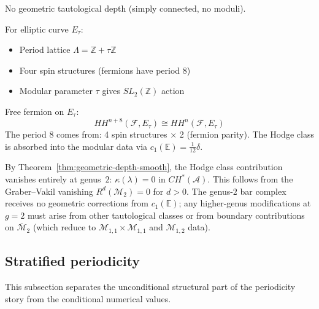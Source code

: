 \begin{example}
No geometric tautological depth (simply connected, no moduli).
\end{example}

\begin{example}
For elliptic curve $E_{\tau}$:
\begin{itemize}
\item Period lattice $\Lambda = \mathbb{Z} + \tau\mathbb{Z}$
\item Four spin structures (fermions have period 8)
\item Modular parameter $\tau$ gives $SL_2(\mathbb{Z})$ action
\end{itemize}

Free fermion on $E_{\tau}$:
\[
HH^{n+8}(\mathcal{F}, E_{\tau}) \cong HH^n(\mathcal{F}, E_{\tau})
\]
The period 8 comes from: 4 spin structures $\times$ 2 (fermion parity).
The Hodge class is absorbed into the modular data via
$c_1(\mathbb{E}) = \frac{1}{12}\delta$.
\end{example}

\begin{example}
\label{ex:genus2-hodge-vanishing}
By Theorem~\ref{thm:geometric-depth-smooth}, the Hodge class
contribution vanishes entirely at genus~$2$:
$\kappa(\lambda) = 0$ in $CH^*(\mathcal{A})$.  This follows from
the Graber--Vakil vanishing $R^d(\mathcal{M}_2) = 0$ for $d > 0$.
The genus-$2$ bar complex receives no geometric corrections from
$c_1(\mathbb{E})$; any higher-genus modifications at $g = 2$ must
arise from other tautological classes or from boundary
contributions on $\overline{\mathcal{M}}_2$ (which reduce to
$\mathcal{M}_{1,1} \times \mathcal{M}_{1,1}$ and
$\mathcal{M}_{1,2}$ data).
\end{example}

\subsection{Stratified periodicity}

This subsection separates the unconditional structural part of the
periodicity story from the conditional numerical values.

